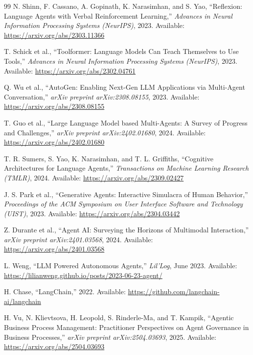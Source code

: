 \documentclass[11pt,a4paper]{article}
\begin{document}
\begin{thebibliography}{99}
N. Shinn, F. Cassano, A. Gopinath, K. Narasimhan, and S. Yao,
``Reflexion: Language Agents with Verbal Reinforcement Learning,''
\textit{Advances in Neural Information Processing Systems (NeurIPS)}, 2023.
Available: \url{https://arxiv.org/abs/2303.11366}

T. Schick et al.,
``Toolformer: Language Models Can Teach Themselves to Use Tools,''
\textit{Advances in Neural Information Processing Systems (NeurIPS)}, 2023.
Available: \url{https://arxiv.org/abs/2302.04761}

Q. Wu et al.,
``AutoGen: Enabling Next-Gen LLM Applications via Multi-Agent Conversation,''
\textit{arXiv preprint arXiv:2308.08155}, 2023.
Available: \url{https://arxiv.org/abs/2308.08155}

T. Guo et al.,
``Large Language Model based Multi-Agents: A Survey of Progress and Challenges,''
\textit{arXiv preprint arXiv:2402.01680}, 2024.
Available: \url{https://arxiv.org/abs/2402.01680}

T. R. Sumers, S. Yao, K. Narasimhan, and T. L. Griffiths,
``Cognitive Architectures for Language Agents,''
\textit{Transactions on Machine Learning Research (TMLR)}, 2024.
Available: \url{https://arxiv.org/abs/2309.02427}

J. S. Park et al.,
``Generative Agents: Interactive Simulacra of Human Behavior,''
\textit{Proceedings of the ACM Symposium on User Interface Software and Technology (UIST)}, 2023.
Available: \url{https://arxiv.org/abs/2304.03442}

Z. Durante et al.,
``Agent AI: Surveying the Horizons of Multimodal Interaction,''
\textit{arXiv preprint arXiv:2401.03568}, 2024.
Available: \url{https://arxiv.org/abs/2401.03568}

L. Weng,
``LLM Powered Autonomous Agents,''
\textit{Lil'Log}, June 2023.
Available: \url{https://lilianweng.github.io/posts/2023-06-23-agent/}

H. Chase,
``LangChain,''
2022.
Available: \url{https://github.com/langchain-ai/langchain}

H. Vu, N. Klievtsova, H. Leopold, S. Rinderle-Ma, and T. Kampik,
``Agentic Business Process Management: Practitioner Perspectives on Agent Governance in Business Processes,''
\textit{arXiv preprint arXiv:2504.03693}, 2025.
Available: \url{https://arxiv.org/abs/2504.03693}


\end{thebibliography}
\end{document}
